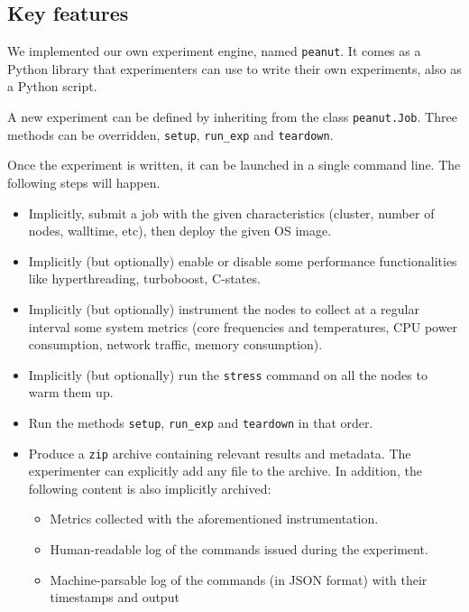         \subsection{Key features}%
        \label{sub:key_features}
            We implemented our own experiment engine, named \texttt{peanut}. It comes as a Python library that
            experimenters can use to write their own experiments, also as a Python script.

            A new experiment can be defined by inheriting from the class \texttt{peanut.Job}. Three methods can be
            overridden, \texttt{setup}, \texttt{run\_exp} and \texttt{teardown}.

            Once the experiment is written, it can be launched in a single command line. The following steps will
            happen.
            \begin{itemize}
                \item Implicitly, submit a job with the given characteristics (\eg cluster, number of nodes, walltime,
                    etc), then deploy the given OS image.
                \item Implicitly (but optionally) enable or disable some performance functionalities like
                    hyperthreading, turboboost, C-states.
                \item Implicitly (but optionally) instrument the nodes to collect at a regular interval some system
                    metrics (\eg core frequencies and temperatures, CPU power consumption, network traffic, memory
                    consumption).
                \item Implicitly (but optionally) run the \texttt{stress} command on all the nodes to warm them up.
                \item Run the methods \texttt{setup}, \texttt{run\_exp} and \texttt{teardown} in that order.
                \item Produce a \texttt{zip} archive containing relevant results and metadata. The experimenter can
                    explicitly add any file to the archive. In addition, the following content is also implicitly
                    archived:
                    \begin{itemize}
                        \item Metrics collected with the aforementioned instrumentation.
                        \item Human-readable log of the commands issued during the experiment.
                        \item Machine-parsable log of the commands (in JSON format) with their timestamps and output

\end{itemize}
\end{itemize}
